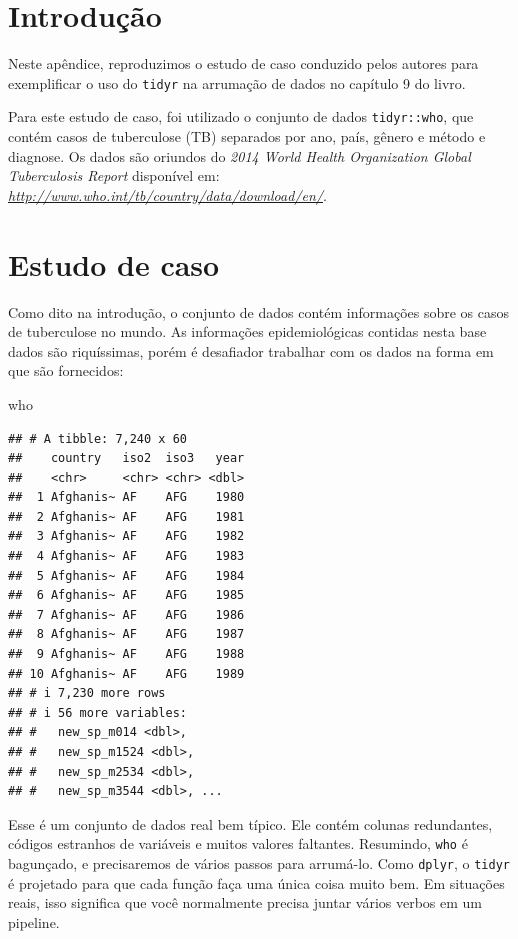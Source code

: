 \documentclass[
]{latex/krantz}
\newenvironment{Shaded}{\begin{snugshade}}{\end{snugshade}}
\newcommand{\NormalTok}[1]{#1}
\theoremstyle{definition}
\theoremstyle{definition}
\theoremstyle{definition}
\theoremstyle{definition}
\theoremstyle{remark}
\begin{document}
\hypertarget{introduuxe7uxe3o-20}{%
\section*{Introdução}\label{introduuxe7uxe3o-20}}

Neste apêndice, reproduzimos o estudo de caso conduzido pelos autores para exemplificar o uso do \texttt{tidyr} na arrumação de dados no capítulo 9 do livro.

Para este estudo de caso, foi utilizado o conjunto de dados \texttt{tidyr::who}, que contém casos de tuberculose (TB) separados por ano, país, gênero e método e diagnose. Os dados são oriundos do \emph{2014 World Health Organization Global Tuberculosis Report} disponível em: \emph{\url{http://www.who.int/tb/country/data/download/en/}}.

\hypertarget{estudo-de-caso-1}{%
\section*{Estudo de caso}\label{estudo-de-caso-1}}

Como dito na introdução, o conjunto de dados contém informações sobre os casos de tuberculose no mundo. As informações epidemiológicas contidas nesta base dados são riquíssimas, porém é desafiador trabalhar com os dados na forma em que são fornecidos:

\begin{Shaded}
\begin{Highlighting}[]
\NormalTok{who}
\end{Highlighting}
\end{Shaded}

\begin{verbatim}
## # A tibble: 7,240 x 60
##    country   iso2  iso3   year
##    <chr>     <chr> <chr> <dbl>
##  1 Afghanis~ AF    AFG    1980
##  2 Afghanis~ AF    AFG    1981
##  3 Afghanis~ AF    AFG    1982
##  4 Afghanis~ AF    AFG    1983
##  5 Afghanis~ AF    AFG    1984
##  6 Afghanis~ AF    AFG    1985
##  7 Afghanis~ AF    AFG    1986
##  8 Afghanis~ AF    AFG    1987
##  9 Afghanis~ AF    AFG    1988
## 10 Afghanis~ AF    AFG    1989
## # i 7,230 more rows
## # i 56 more variables:
## #   new_sp_m014 <dbl>,
## #   new_sp_m1524 <dbl>,
## #   new_sp_m2534 <dbl>,
## #   new_sp_m3544 <dbl>, ...
\end{verbatim}

Esse é um conjunto de dados real bem típico. Ele contém colunas redundantes, códigos estranhos de variáveis e muitos valores faltantes. Resumindo, \texttt{who} é bagunçado, e precisaremos de vários passos para arrumá-lo. Como \texttt{dplyr}, o \texttt{tidyr} é projetado para que cada função faça uma única coisa muito bem. Em situações reais, isso significa que você normalmente precisa juntar vários verbos em um pipeline.
\end{document}
